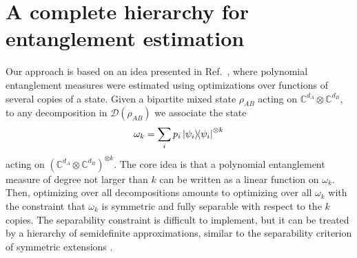 \documentclass[aps,pra,twocolumn,superscriptaddress]{revtex4-2}
\newcommand{\C}{\mathds{C}}
\begin{document}
\section{A complete hierarchy for entanglement estimation}
Our approach is based on an idea presented in Ref.~\cite{Toth2015CroofTP}, where polynomial entanglement measures were estimated using
optimizations over functions of several copies of a state.
Given a bipartite mixed state $\rho_{AB}$ acting on $\C^{d_A} \otimes \C^{d_B}$, to any decomposition in $\mathcal{D}(\rho_{AB})$ we associate the state
\begin{equation}\label{eq:omega}
    \omega_k = \sum_i p_i \dyad{\psi_i}^{\otimes k}
\end{equation}
acting on $(\C^{d_A} \otimes \C^{d_B})^{\otimes k}$.
The core idea is that a polynomial entanglement measure of degree not larger than $k$ can be written as a linear function on $\omega_k$. Then, optimizing over all decompositions amounts to optimizing over all $\omega_k$ with
the constraint that $\omega_k$ is symmetric and fully separable with respect to the $k$ copies. The separability constraint is difficult to implement, but it can be treated by a hierarchy of semidefinite approximations, similar to the separability criterion of symmetric extensions
\cite{doherty2002}.
\end{document}
